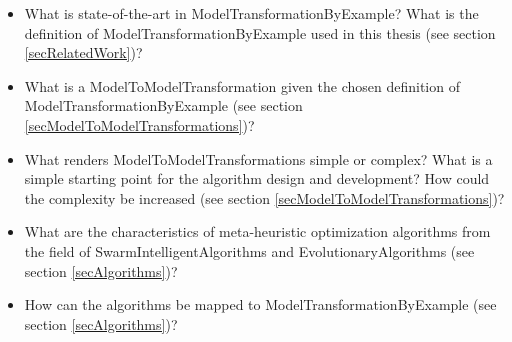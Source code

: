 \begin{itemize}
	\item What is state-of-the-art in \gls{ModelTransformationByExample}? What is the definition of \gls{ModelTransformationByExample} used in this thesis (see section \ref{secRelatedWork})? 
	\item What is a \gls{ModelToModelTransformation} given the chosen definition of \gls{ModelTransformationByExample} (see section \ref{secModelToModelTransformations})? 
	\item What renders \glspl{ModelToModelTransformation} simple or complex? What is a simple starting point for the algorithm design and development? How could the complexity be increased (see section \ref{secModelToModelTransformations})? 
	\item What are the characteristics of meta-heuristic optimization algorithms from the field of \glspl{SwarmIntelligentAlgorithm} and \glspl{EvolutionaryAlgorithm} (see section \ref{secAlgorithms})? 
	\item How can the algorithms be mapped to \gls{ModelTransformationByExample} (see section \ref{secAlgorithms})? 
\end{itemize}




